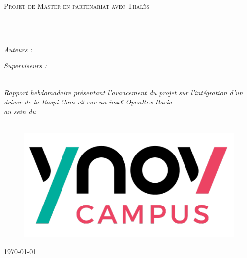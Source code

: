 \documentclass[
	11pt, %
	french, %
	singlespacing, %
	headsepline, %
	]{MastersDoctoralThesis} %
\begin{document}
	\begin{titlepage}
	\begin{center}

	\vspace*{.06\textheight}
	{\scshape\LARGE \univname\par}\vspace{1.5cm} %
	\textsc{\Large Projet de Master en partenariat avec Thalès}\\[0.5cm] %

	\HRule \\[0.4cm] %
	{\huge \bfseries \ttitle\par}\vspace{0.4cm} %
	\HRule \\[1.5cm] %

	\begin{minipage}[t]{0.4\textwidth}
	\begin{flushleft} \large
	\emph{Auteurs :}\\
	\authorname %
	\end{flushleft}
	\end{minipage}
	\begin{minipage}[t]{0.4\textwidth}
	\begin{flushright} \large
	\emph{Superviseurs :} \\
	\supname %
	\end{flushright}
	\end{minipage}\\[2.5cm]

	\large \textit{Rapport hebdomadaire présentant l'avancement du projet sur l'intégration
	 d'un driver de la Raspi Cam v2 sur un imx6 OpenRex Basic}\\[0.3cm] %
	\textit{au sein du}\\[0.7cm]
	\deptname \\ [0.5cm]

	\begin{figure}[!htb]
			\centering
			\includegraphics[width=0.2\linewidth]{Figures/Ynov.png}
	\end{figure}

	{\large \today}\\[4cm] %

	\vfill
	\end{center}
	\end{titlepage}
\end{document}
